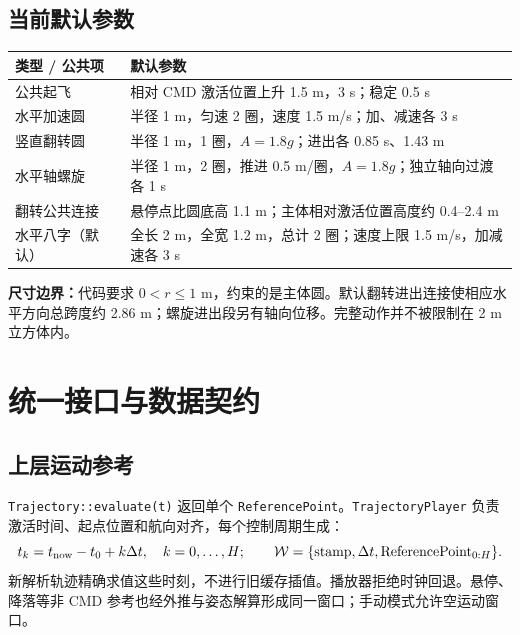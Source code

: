 \documentclass[UTF8,fontset=fandol,a4paper,10pt]{ctexart}
\newcommand{\code}[1]{{\small\nolinkurl{#1}}}
\newcommand{\note}[1]{\par\noindent\colorbox{teal!8}{\parbox{\dimexpr\linewidth-2\fboxsep\relax}{#1}}\par}
\begin{document}
\subsection{当前默认参数}
\par\noindent\begin{tabularx}{\linewidth}{@{}p{29mm}Y@{}}\toprule
类型 / 公共项 & 默认参数\\\midrule
公共起飞 & 相对 CMD 激活位置上升 1.5 m，3 s；稳定 0.5 s\\
水平加速圆 & 半径 1 m，匀速 2 圈，速度 1.5 m/s；加、减速各 3 s\\
竖直翻转圆 & 半径 1 m，1 圈，$A=1.8g$；进出各 0.85 s、1.43 m\\
水平轴螺旋 & 半径 1 m，2 圈，推进 0.5 m/圈，$A=1.8g$；独立轴向过渡各 1 s\\
翻转公共连接 & 悬停点比圆底高 1.1 m；主体相对激活位置高度约 0.4--2.4 m\\
水平八字（默认） & 全长 2 m，全宽 1.2 m，总计 2 圈；速度上限 1.5 m/s，加减速各 3 s\\\bottomrule
\end{tabularx}\par
\note{\textbf{尺寸边界：}代码要求 $0<r\leq1$ m，约束的是主体圆。默认翻转进出连接使相应水平方向总跨度约 2.86 m；螺旋进出段另有轴向位移。完整动作并不被限制在 2 m 立方体内。}

\clearpage
\section{统一接口与数据契约}
\subsection{上层运动参考}
\code{Trajectory::evaluate(t)} 返回单个 \code{ReferencePoint}。\code{TrajectoryPlayer} 负责激活时间、起点位置和航向对齐，每个控制周期生成：
\[
 t_k=t_{\rm now}-t_0+k\Delta t,\quad k=0,\ldots,H;\qquad
 \mathcal W=\{\text{stamp},\Delta t,\mathrm{ReferencePoint}_{0:H}\}.
\]
新解析轨迹精确求值这些时刻，不进行旧缓存插值。播放器拒绝时钟回退。悬停、降落等非 CMD 参考也经外推与姿态解算形成同一窗口；手动模式允许空运动窗口。
\end{document}
